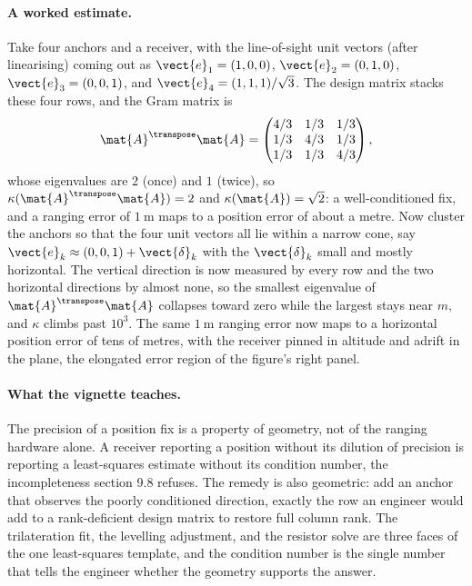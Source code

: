 \paragraph{A worked estimate.}
Take four anchors and a receiver, with the line-of-sight unit vectors
(after linearising) coming out as $\vect{e}_{1} = (1, 0, 0)$,
$\vect{e}_{2} = (0, 1, 0)$, $\vect{e}_{3} = (0, 0, 1)$, and
$\vect{e}_{4} = (1, 1, 1)/\sqrt{3}$. The design matrix stacks these
four rows, and the Gram matrix is
\[
\mat{A}^{\transpose}\mat{A} = \begin{pmatrix}
4/3 & 1/3 & 1/3 \\
1/3 & 4/3 & 1/3 \\
1/3 & 1/3 & 4/3
\end{pmatrix},
\]
whose eigenvalues are $2$ (once) and $1$ (twice), so $\kappa(\mat{A}^{
\transpose}\mat{A}) = 2$ and $\kappa(\mat{A}) = \sqrt{2}$: a
well-conditioned fix, and a ranging error of $\SI{1}{\meter}$ maps to a
position error of about a metre. Now cluster the anchors so that the
four unit vectors all lie within a narrow cone, say $\vect{e}_{k}
\approx (0, 0, 1) + \vect{\delta}_{k}$ with the $\vect{\delta}_{k}$
small and mostly horizontal. The vertical direction is now measured by
every row and the two horizontal directions by almost none, so the
smallest eigenvalue of $\mat{A}^{\transpose}\mat{A}$ collapses toward
zero while the largest stays near $m$, and $\kappa$ climbs past
$10^{3}$. The same $\SI{1}{\meter}$ ranging error now maps to a
horizontal position error of tens of metres, with the receiver pinned
in altitude and adrift in the plane, the elongated error region of the
figure's right panel.

\paragraph{What the vignette teaches.}
The precision of a position fix is a property of geometry, not of the
ranging hardware alone. A receiver reporting a position without its
dilution of precision is reporting a least-squares estimate without its
condition number, the incompleteness section 9.8 refuses. The remedy is
also geometric: add an anchor that observes the poorly conditioned
direction, exactly the row an engineer would add to a rank-deficient
design matrix to restore full column rank. The trilateration fit, the
levelling adjustment, and the resistor solve are three faces of the one
least-squares template, and the condition number is the single number
that tells the engineer whether the geometry supports the answer.


